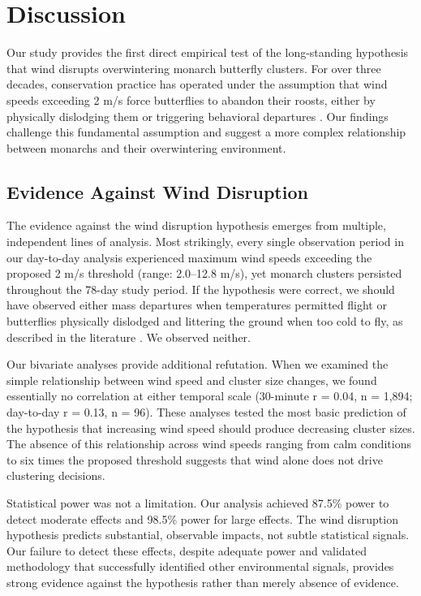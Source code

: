 \section{Discussion}

Our study provides the first direct empirical test of the long-standing hypothesis that wind disrupts overwintering monarch butterfly clusters. For over three decades, conservation practice has operated under the assumption that wind speeds exceeding 2 m/s force butterflies to abandon their roosts, either by physically dislodging them or triggering behavioral departures \parencite{leongEvaluatingManagementCalifornia2016}. Our findings challenge this fundamental assumption and suggest a more complex relationship between monarchs and their overwintering environment.

\subsection{Evidence Against Wind Disruption}

The evidence against the wind disruption hypothesis emerges from multiple, independent lines of analysis. Most strikingly, every single observation period in our day-to-day analysis experienced maximum wind speeds exceeding the proposed 2 m/s threshold (range: 2.0--12.8 m/s), yet monarch clusters persisted throughout the 78-day study period. If the hypothesis were correct, we should have observed either mass departures when temperatures permitted flight or butterflies physically dislodged and littering the ground when too cold to fly, as described in the literature \parencite{leongRestorationOverwinteringGrove1999}. We observed neither.

Our bivariate analyses provide additional refutation. When we examined the simple relationship between wind speed and cluster size changes, we found essentially no correlation at either temporal scale (30-minute r = 0.04, n = 1,894; day-to-day r = 0.13, n = 96). These analyses tested the most basic prediction of the hypothesis that increasing wind speed should produce decreasing cluster sizes. The absence of this relationship across wind speeds ranging from calm conditions to six times the proposed threshold suggests that wind alone does not drive clustering decisions.

Statistical power was not a limitation. Our analysis achieved 87.5\% power to detect moderate effects and 98.5\% power for large effects. The wind disruption hypothesis predicts substantial, observable impacts, not subtle statistical signals. Our failure to detect these effects, despite adequate power and validated methodology that successfully identified other environmental signals, provides strong evidence against the hypothesis rather than merely absence of evidence.

